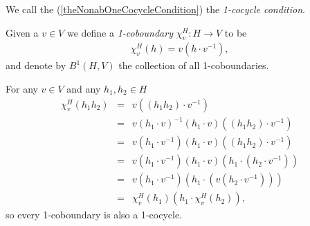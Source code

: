 We call the (\ref{theNonabOneCocycleCondition}) the \emph{1-cocycle condition}.



Given a $v \in V$ we define a \emph{1-coboundary} $\chi^H_v:H\rightarrow V$ to be
\begin{eqnarray*}
	\chi^H_v (h) = v (h\cdot v^{-1}),
\end{eqnarray*}
and denote by $B^1\left(H, V\right)$ the collection of all 1-coboundaries. 

For any $v \in V$ and any $h_1, h_2 \in H$
\begin{eqnarray*}
	\chi^H_v(h_1h_2) &=& v ((h_1h_2) \cdot v^{-1}) \\
	&=& v (h_1 \cdot v)^{-1} (h_1 \cdot v) ((h_1h_2) \cdot v^{-1}) \\
	&=& v (h_1 \cdot v^{-1}) (h_1 \cdot v) ((h_1h_2) \cdot v^{-1}) \\
	&=& v (h_1 \cdot v^{-1}) (h_1 \cdot v) (h_1 \cdot (h_2 \cdot v^{-1})) \\
	&=& v (h_1 \cdot v^{-1}) (h_1 \cdot (v (h_2 \cdot v^{-1}))) \\
	&=& \chi^H_v(h_1) (h_1 \cdot \chi^H_v(h_2)),
\end{eqnarray*}
so every 1-coboundary is also a 1-cocycle. 

